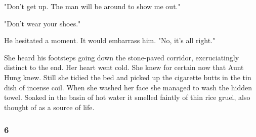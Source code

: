 \par "Don't get up. The man will be around to show me out."
\par "Don't wear your shoes."
\par He hesitated a moment. It would embarrass him. "No, it's all right."
\par She heard his footsteps going down the stone-paved corridor, excruciatingly distinct to the end. Her heart went cold. She knew for certain now that Aunt Hung knew. Still she tidied the bed and picked up the cigarette butts in the tin dish of incense coil. When she washed her face she managed to wash the hidden towel. Soaked in the basin of hot water it smelled faintly of thin rice gruel, also thought of as a source of life.












\subsubsection*{6}

